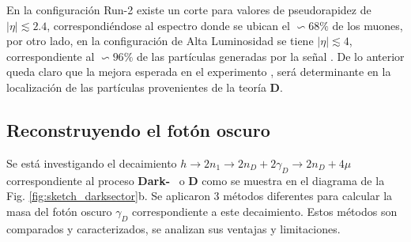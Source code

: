 En la configuración  Run-2 existe un corte para valores de pseudorapidez de $|\eta|\lesssim 2.4$, correspondiéndose al espectro donde se ubican el $\backsim 68\%$ de los muones, por otro lado, en la configuración de Alta Luminosidad se tiene $|\eta|\lesssim 4$, correspondiente al $\backsim 96\%$ de las partículas generadas por la señal \MC. De lo anterior queda claro que la mejora esperada en el experimento \CMS, será determinante en la localización de las partículas provenientes de la teoría \MSSM\textbf{D}.

\subsection{Reconstruyendo el fotón oscuro}
Se está investigando el decaimiento $h \rightarrow 2n_1 \rightarrow 2n_D + 2\gamma_D \rightarrow 2n_D + 4\mu$ correspondiente al proceso \textbf{Dark-}\SUSY ~ o \MSSM\textbf{D} como se muestra en el diagrama de la Fig. \ref{fig:sketch_darksector}b. Se aplicaron 3 métodos diferentes para calcular la masa del fotón oscuro $\gamma_D$ correspondiente a este decaimiento. Estos métodos son comparados y caracterizados, se analizan sus ventajas y limitaciones.



